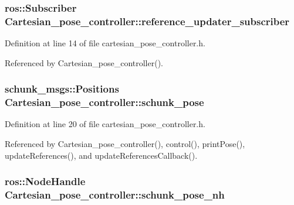 \hypertarget{classCartesian__pose__controller_a9394ae99649279f815c234b1ca7801b6}{
\subsubsection[{reference\-\_\-updater\-\_\-subscriber}]{\setlength{\rightskip}{0pt plus 5cm}ros\-::\-Subscriber Cartesian\-\_\-pose\-\_\-controller\-::reference\-\_\-updater\-\_\-subscriber\hspace{0.3cm}{\ttfamily [private]}}}\label{classCartesian__pose__controller_a9394ae99649279f815c234b1ca7801b6}


Definition at line 14 of file cartesian\-\_\-pose\-\_\-controller.\-h.



Referenced by Cartesian\-\_\-pose\-\_\-controller().

\hypertarget{classCartesian__pose__controller_a301bc44e901e4837cf036661478354c4}{
\subsubsection[{schunk\-\_\-pose}]{\setlength{\rightskip}{0pt plus 5cm}schunk\-\_\-msgs\-::\-Positions Cartesian\-\_\-pose\-\_\-controller\-::schunk\-\_\-pose\hspace{0.3cm}{\ttfamily [private]}}}\label{classCartesian__pose__controller_a301bc44e901e4837cf036661478354c4}


Definition at line 20 of file cartesian\-\_\-pose\-\_\-controller.\-h.



Referenced by Cartesian\-\_\-pose\-\_\-controller(), control(), print\-Pose(), update\-References(), and update\-References\-Callback().

\hypertarget{classCartesian__pose__controller_a41a692189fed59ec8ec8460539f63c66}{
\subsubsection[{schunk\-\_\-pose\-\_\-nh}]{\setlength{\rightskip}{0pt plus 5cm}ros\-::\-Node\-Handle Cartesian\-\_\-pose\-\_\-controller\-::schunk\-\_\-pose\-\_\-nh\hspace{0.3cm}{\ttfamily [private]}}}\label{classCartesian__pose__controller_a41a692189fed59ec8ec8460539f63c66}


